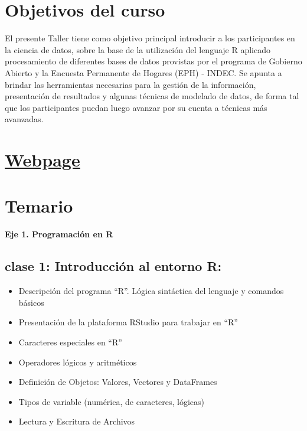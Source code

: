 \documentclass[]{book}
\providecommand{\tightlist}{%
  \setlength{\itemsep}{0pt}\setlength{\parskip}{0pt}}
\begin{document}
\hypertarget{objetivos-del-curso}{%
\section{Objetivos del curso}\label{objetivos-del-curso}}

El presente Taller tiene como objetivo principal introducir a los participantes en la ciencia de datos, sobre la base de la utilización del lenguaje R aplicado procesamiento de diferentes bases de datos provistas por el programa de Gobierno Abierto y la Encuesta Permanente de Hogares (EPH) - INDEC. Se apunta a brindar las herramientas necesarias para la gestión de la información, presentación de resultados y algunas técnicas de modelado de datos, de forma tal que los participantes puedan luego avanzar por su cuenta a técnicas más avanzadas.

\hypertarget{webpage}{%
\section{\texorpdfstring{\href{https://diegokoz.github.io/intro_ds/}{Webpage}}{Webpage}}\label{webpage}}

\hypertarget{temario}{%
\section{Temario}\label{temario}}

\textbf{Eje 1. Programación en R}

\hypertarget{clase-1-introduccion-al-entorno-r}{%
\subsection{\texorpdfstring{\textbf{clase 1}: Introducción al entorno R:}{clase 1: Introducción al entorno R:}}\label{clase-1-introduccion-al-entorno-r}}

\begin{itemize}
\tightlist
\item
  Descripción del programa ``R''. Lógica sintáctica del lenguaje y comandos básicos
\item
  Presentación de la plataforma RStudio para trabajar en ``R''
\item
  Caracteres especiales en ``R''
\item
  Operadores lógicos y aritméticos
\item
  Definición de Objetos: Valores, Vectores y DataFrames
\item
  Tipos de variable (numérica, de caracteres, lógicas)
\item
  Lectura y Escritura de Archivos
\end{itemize}
\end{document}
